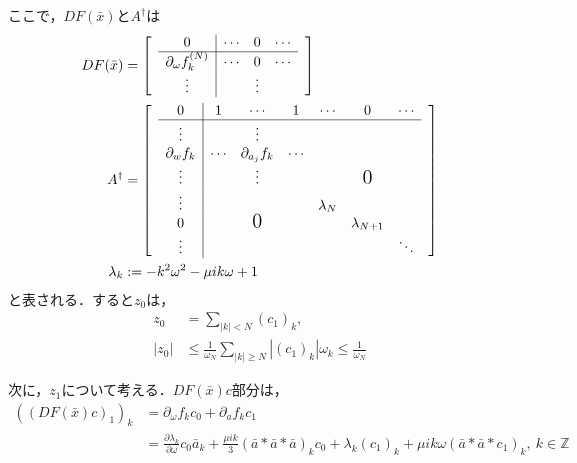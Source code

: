ここで，$DF(\bar{x})とA^\dagger$は
\begin{align*}
  DF(\bar{x}) & = \begin{bmatrix}
                     & \multicolumn{0}{c|}{0}                         & \cdots & 0      & \cdots & \\ \cline{2-5}
                     & \multicolumn{1}{c|}{\partial_\omega f_k^{(N)}} & \cdots & 0      & \cdots & \\
                     & \multicolumn{1}{c|}{\vdots}                    &        & \vdots &        &
                  \end{bmatrix}                                         \\
  A^\dagger   & = \begin{bmatrix}
                     & \multicolumn{1}{c|}{0}              & 1      & \cdots            & 1      & \cdots    & 0                & \cdots & \\ \cline{2-8}
                     & \multicolumn{1}{c|}{\vdots}         &        & \vdots            &        &           &                  &        & \\
                     & \multicolumn{1}{c|}{\partial_w f_k} & \cdots & \partial_{a_j}f_k & \cdots &           &                  &          \\
                     & \multicolumn{1}{c|}{\vdots}         &        & \vdots            &        &           & \text{\Large{0}} &          \\
                     & \multicolumn{1}{c|}{\vdots}         &        &                   &        & \lambda_N &                  &        & \\
                     & \multicolumn{1}{c|}{0}              &        & \text{\Large{0}}  &        &           & \lambda_{N+1}    &          \\
                     & \multicolumn{1}{c|}{\vdots}         &        &                   &        &           &                  & \ddots
                  \end{bmatrix} \\
  \lambda_k   & := -k^2\omega^2 - \mu ik\omega + 1
\end{align*}
と表される．すると$z_0$は，
\begin{align*}
  z_0 & = \sum_{|k|<N} (c_1)_k, \\
  |z_0| &\leq \frac{1}{\omega_N} \sum_{|k| \geq N} |(c_1)_k| \omega_k \leq \frac{1}{\omega_N}
\end{align*}

次に，$z_1$について考える．$DF(\bar{x})c$部分は，
\begin{equation*}
  \begin{split}
    \left(\left(DF(\bar{x})c\right)_1 \right)_k &= \partial_\omega f_k c_0 + \partial_a f_k c_1 \\
    &= \frac{\partial \lambda_k}{\partial \omega} c_0 \bar{a}_k + \frac{\mu ik}{3} \left( \bar{a} * \bar{a} * \bar{a} \right)_k c_0 + \lambda_k (c_1)_k + \mu ik \omega \left( \bar{a} * \bar{a} * c_1 \right)_k,\ k \in \mathbb{Z}
  \end{split}
\end{equation*}

